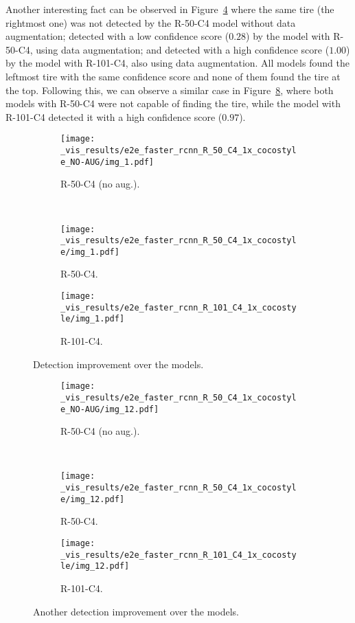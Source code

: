 %
Another interesting fact can be observed in Figure~\ref{fig:improv_1} where the same tire (the rightmost one) was not detected by the R-50-C4 model without data augmentation; detected with a low confidence score ($0.28$) by the model with R-50-C4, using data augmentation; and detected with a high confidence score ($1.00$) by the model with R-101-C4, also using data augmentation.
All models found the leftmost tire with the same confidence score and none of them found the tire at the top.
Following this, we can observe a similar case in Figure~\ref{fig:improv_2}, where both models with R-50-C4 were not capable of finding the tire, while the model with R-101-C4 detected it with a high confidence score ($0.97$).
%
\begin{figure}[th!]
  \centering
  \begin{subfigure}[t]{.9\linewidth}
    \centering
    \texttt{[image: \_vis\_results/e2e\_faster\_rcnn\_R\_50\_C4\_1x\_cocostyle\_NO-AUG/img\_1.pdf]}
    \caption{R-50-C4 (no aug.).}
    \label{fig:improv_50N}
  \end{subfigure}\\
  \begin{subfigure}[t]{0.9\linewidth}
    \centering
    \texttt{[image: \_vis\_results/e2e\_faster\_rcnn\_R\_50\_C4\_1x\_cocostyle/img\_1.pdf]}
    \caption{R-50-C4.}
    \label{fig:improv_50}
  \end{subfigure}
  \begin{subfigure}[t]{0.9\linewidth}
    \centering
    \texttt{[image: \_vis\_results/e2e\_faster\_rcnn\_R\_101\_C4\_1x\_cocostyle/img\_1.pdf]}
    \caption{R-101-C4.}
    \label{fig:improv_101}
  \end{subfigure}
  \caption{Detection improvement over the models.}
  \label{fig:improv_1}
\end{figure}
%
%
\begin{figure}[th!]
  \centering
  \begin{subfigure}[t]{.9\linewidth}
    \centering
    \texttt{[image: \_vis\_results/e2e\_faster\_rcnn\_R\_50\_C4\_1x\_cocostyle\_NO-AUG/img\_12.pdf]}
    \caption{R-50-C4 (no aug.).}
    \label{fig:improv_50N}
  \end{subfigure}\\
  \begin{subfigure}[t]{0.9\linewidth}
    \centering
    \texttt{[image: \_vis\_results/e2e\_faster\_rcnn\_R\_50\_C4\_1x\_cocostyle/img\_12.pdf]}
    \caption{R-50-C4.}
    \label{fig:improv_50}
  \end{subfigure}
  \begin{subfigure}[t]{0.9\linewidth}
    \centering
    \texttt{[image: \_vis\_results/e2e\_faster\_rcnn\_R\_101\_C4\_1x\_cocostyle/img\_12.pdf]}
    \caption{R-101-C4.}
    \label{fig:improv_101}
  \end{subfigure}
  \caption{Another detection improvement over the models.}
  \label{fig:improv_2}
\end{figure}
%


